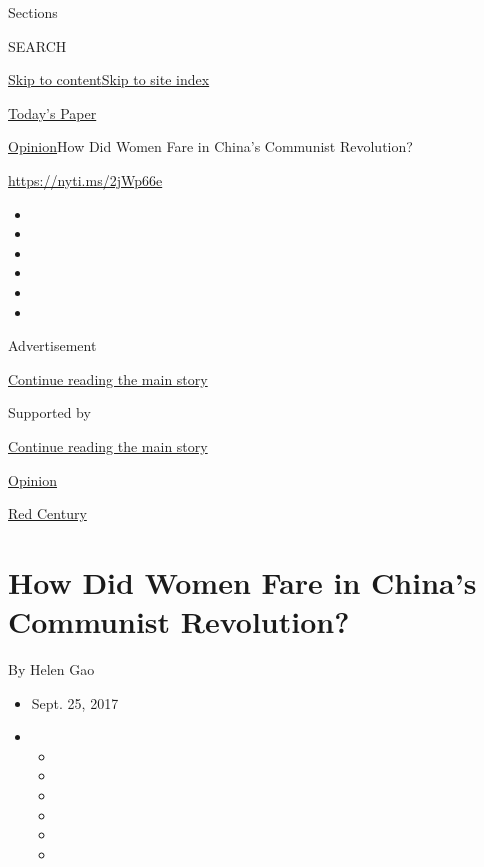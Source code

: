Sections

SEARCH

\protect\hyperlink{site-content}{Skip to
content}\protect\hyperlink{site-index}{Skip to site index}

\href{https://myaccount.nytimes.com/auth/login?response_type=cookie\&client_id=vi}{}

\href{https://www.nytimes.com/section/todayspaper}{Today's Paper}

\href{/section/opinion}{Opinion}\textbar{}How Did Women Fare in China's
Communist Revolution?

\href{https://nyti.ms/2jWp66e}{https://nyti.ms/2jWp66e}

\begin{itemize}
\item
\item
\item
\item
\item
\item
\end{itemize}

Advertisement

\protect\hyperlink{after-top}{Continue reading the main story}

Supported by

\protect\hyperlink{after-sponsor}{Continue reading the main story}

\href{/section/opinion}{Opinion}

\href{/column/red-century}{Red Century}

\hypertarget{how-did-women-fare-in-chinas-communist-revolution}{%
\section{How Did Women Fare in China's Communist
Revolution?}\label{how-did-women-fare-in-chinas-communist-revolution}}

By Helen Gao

\begin{itemize}
\item
  Sept. 25, 2017
\item
  \begin{itemize}
  \item
  \item
  \item
  \item
  \item
  \item
  \end{itemize}
\end{itemize}

